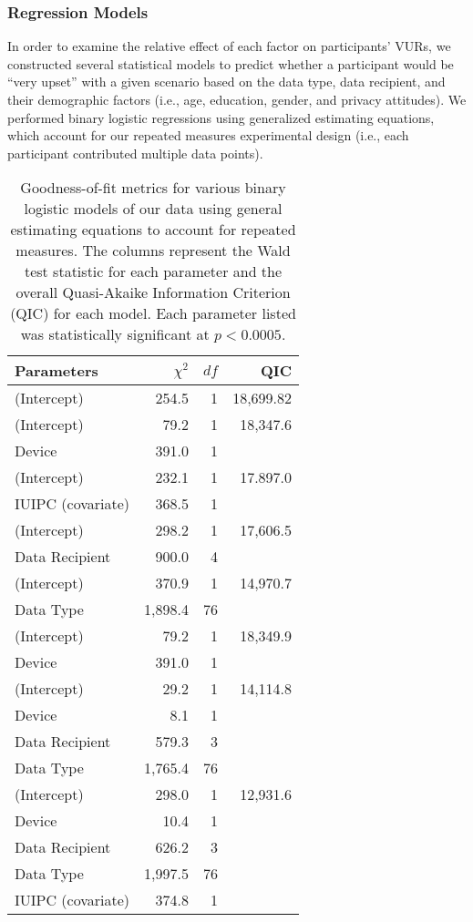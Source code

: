\subsubsection{Regression Models} 
\label{sec:regression}
In order to examine the relative effect of each factor on participants' VURs, we constructed several statistical models to predict whether a participant would be ``very upset'' with a given scenario based on the data type, data recipient, and their demographic factors (i.e., age, education, gender, and privacy attitudes). We performed binary logistic regressions using generalized estimating equations, which account for our repeated measures experimental design (i.e., each participant contributed multiple data points).

\begin{table}[t]
\centering
\begin{tabular}{|l| r| r| r|}
\hline
Parameters & $\chi^2$ & $df$ & QIC\\
\hline
\hline
(Intercept) & 254.5 & 1 & 18,699.82\\
\hline
(Intercept) & 79.2 & 1 & 18,347.6\\
Device & 391.0 & 1 & \\
\hline
(Intercept) & 232.1 & 1 & 17.897.0\\
IUIPC (covariate) & 368.5 & 1 & \\
\hline
(Intercept) & 298.2 & 1 &17,606.5\\
Data Recipient & 900.0 & 4 & \\
\hline
(Intercept) & 370.9 & 1 & 14,970.7\\
Data Type & 1,898.4& 76 & \\
\hline
(Intercept) & 79.2 & 1 & 18,349.9\\
Device & 391.0 & 1 & \\
\hline
(Intercept) & 29.2 & 1 & 14,114.8\\
Device & 8.1 & 1 &  \\
Data Recipient & 579.3 & 3 & \\
Data Type & 1,765.4 & 76 &  \\
\hline
(Intercept) & 298.0 & 1 & 12,931.6 \\
Device  & 10.4 & 1 &  \\
Data Recipient & 626.2 & 3 & \\
Data Type & 1,997.5 & 76 & \\
IUIPC (covariate) & 374.8 & 1 & \\
\hline
\end{tabular}
\caption{Goodness-of-fit metrics for various binary logistic models of our data using general estimating equations to account for repeated measures. The columns represent the Wald test statistic for each parameter and the overall Quasi-Akaike Information Criterion (QIC) for each model. Each parameter listed was statistically significant at $p<0.0005$.}
\label{regression}
\end{table}

